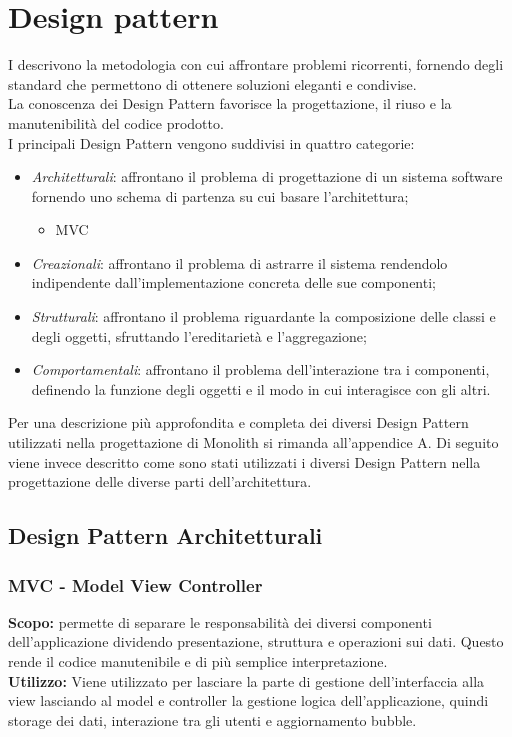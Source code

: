 \section{Design pattern}
I  descrivono la metodologia con cui affrontare problemi ricorrenti, fornendo degli standard che permettono di ottenere soluzioni eleganti e condivise.\\
La conoscenza dei Design Pattern favorisce la progettazione, il riuso e la manutenibilità del codice prodotto.\\
I principali Design Pattern vengono suddivisi in quattro categorie:
\begin{itemize}
	\item \textit{Architetturali}: affrontano il problema di progettazione di un sistema software fornendo uno schema di partenza su cui basare l’architettura;
	\begin{itemize}
		\item{MVC}
	\end{itemize}
	\item \textit{Creazionali}: affrontano il problema di astrarre il sistema rendendolo indipendente dall’implementazione concreta delle sue componenti;
	\item \textit{Strutturali}: affrontano il problema riguardante la composizione delle classi e degli oggetti, sfruttando l’ereditarietà e l'aggregazione;
	\item \textit{Comportamentali}: affrontano il problema dell’interazione tra i componenti, definendo la funzione degli oggetti e il modo in cui interagisce con gli altri.
\end{itemize}
Per una descrizione più approfondita e completa dei diversi Design Pattern utilizzati nella progettazione di Monolith si rimanda all'appendice A. Di seguito viene invece descritto come sono stati utilizzati i diversi Design Pattern nella progettazione delle diverse parti dell'architettura.

\subsection{Design Pattern Architetturali}

\subsubsection{MVC - Model View Controller}
\textbf{Scopo:} permette di separare le responsabilità dei diversi componenti dell’applicazione dividendo presentazione, struttura e operazioni sui dati. Questo rende il codice manutenibile e di più semplice interpretazione.\\
\textbf{Utilizzo:} Viene utilizzato per lasciare la parte di gestione dell’interfaccia alla view lasciando al model e controller la gestione logica dell’applicazione, quindi storage dei dati, interazione tra gli utenti e aggiornamento bubble.

